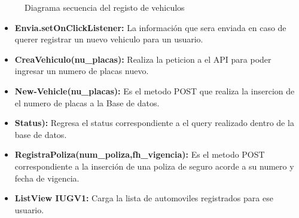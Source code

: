 \begin{figure}[htbp!]
	\centering
	\caption{Diagrama secuencia del registo de vehiculos}
	\label{fig:RegistraVehiculo}
\end{figure}
\begin{itemize}
	\item \textbf{Envia.setOnClickListener:} La información que sera enviada en caso de querer registrar un nuevo vehiculo para un usuario.
	\item \textbf{CreaVehiculo(nu_placas):} Realiza la peticion a el API para poder ingresar un numero de placas nuevo.
	\item \textbf{New-Vehicle(nu_placas):} Es el metodo POST que realiza la insercion de el numero de placas a la Base de datos.
	\item \textbf{Status):} Regresa el status correspondiente a el query realizado dentro de la base de datos.
	\item \textbf{RegistraPoliza(num_poliza,fh_vigencia):} Es el metodo POST correspondiente a la inserción de una poliza de seguro acorde a su numero y fecha de vigencia.
	\item \textbf{ListView IUGV1:} Carga la lista de automoviles registrados para ese usuario.

\end{itemize}

